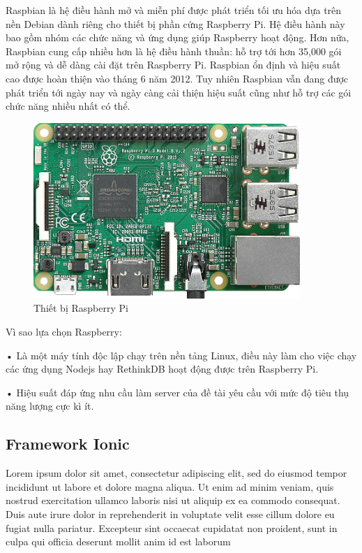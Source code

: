 Raspbian là hệ điều hành mở và miễn phí được phát triển tối ưu hóa dựa trên nền Debian dành riêng cho thiết bị phần cứng Raspberry Pi. Hệ điều hành này bao gồm nhóm các chức năng và ứng dụng giúp Raspberry hoạt động. Hơn nữa, Raspbian cung cấp nhiều hơn là hệ điều hành thuần: hỗ trợ tới hơn 35,000 gói mở rộng và dễ dàng cài đặt trên Raspberry Pi. Raspbian ổn định và hiệu suất cao được hoàn thiện vào tháng 6 năm 2012. Tuy nhiên Raspbian vẫn đang được phát triển tới ngày nay và ngày càng cải thiện hiệu suất cũng như hỗ trợ các gói chức năng nhiều nhất có thể.
\begin{figure}[H]
	\centering    
	\includegraphics[width=0.9\textwidth]{rasp}
	\caption[Thiết bị Raspberry Pi]{Thiết bị Raspberry Pi}
	\label{fig: rasp}
\end{figure}

Vì sao lựa chọn Raspberry:

• Là một máy tính độc lập chạy trên nền tảng Linux, điều này làm cho việc chạy các ứng dụng Nodejs hay RethinkDB hoạt động được trên Raspberry Pi.

• Hiệu suất đáp ứng nhu cầu làm server của đề tài yêu cầu với mức độ tiêu thụ năng lượng cực kì ít.

\subsection{Framework Ionic}
Lorem ipsum dolor sit amet, consectetur adipiscing elit, sed do eiusmod tempor incididunt ut labore et dolore magna aliqua. Ut enim ad minim veniam, quis nostrud exercitation ullamco laboris nisi ut aliquip ex ea commodo consequat. Duis aute irure dolor in reprehenderit in voluptate velit esse cillum dolore eu fugiat nulla pariatur. Excepteur sint occaecat cupidatat non proident, sunt in culpa qui officia deserunt mollit anim id est laborum